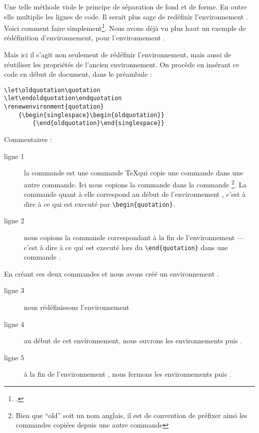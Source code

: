 Une telle méthode viole le principe de séparation de fond et de forme. En outre elle multiplie les lignes de code. Il serait plus sage de redéfinir l'environnement . Voici comment faire simplement\footcite[Nous nous somme basés sur la classe ][]{bredele}. Nous avons déjà vu plus haut un exemple de rédéfinition d'environnement, pour l'environnement . 

Mais ici il s'agit non seulement de rédéfinir l'environnement, mais aussi de réutiliser les propriétés de l'ancien environnement. On procède en insérant ce code en début de document, dans le préambule :

\begin{verbatim}
\let\oldquotation\quotation
\let\endoldquotation\endquotation
\renewenvironment{quotation}
	{\begin{singlespace}\begin{oldquotation}}
        {\end{oldquotation}\end{singlespace}}
\end{verbatim}

Commentaires : 

\begin{description}
\item[ligne 1]la commande  est une commande \TeX qui copie une commande dans une autre commande. Ici nous copions la commande  dans la commande \footnote{Bien que \enquote{old} soit un nom anglais, il est de convention de préfixer ainsi les commandes copiées depuis une autre commande}. La commande  quant à elle correspond au début de l'environnement , c'est à dire à ce qui est executé par \verb|\begin{quotation}|.
\item[ligne 2] nous copions la commande  correspondant à la fin de l'environnement   --- c'est à dire à ce qui est executé lors du \verb|\end{quotation}| dans une commande .
\end{description}

En créant ces deux commandes  et  nous avons créé un environnement .

\begin{description}
\item[ligne 3]nous rédéfinissons l'environnement 
\item[ligne 4]au début de cet environnement, nous ouvrons les environnements  puis .
\item[ligne 5]à la fin de l'environnement , nous fermons les environnements  puis .
\end{description}

